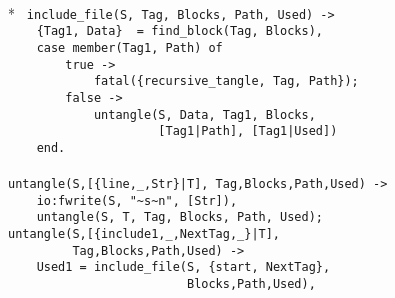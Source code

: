 \begin{flushleft}
\label{etangle_4_4}
\\*
\tt
\noindent{}%
\verb&include_file(S, Tag, Blocks, Path, Used) ->&\\
\noindent{}%
\verb&    {Tag1, Data}  = find_block(Tag, Blocks),&\\
\noindent{}%
\verb&    case member(Tag1, Path) of&\\
\noindent{}%
\verb&        true ->&\\
\noindent{}%
\verb&            fatal({recursive_tangle, Tag, Path});&\\
\noindent{}%
\verb&        false ->&\\
\noindent{}%
\verb&            untangle(S, Data, Tag1, Blocks,&\\
\noindent{}%
\verb&                     [Tag1|Path], [Tag1|Used])&\\
\noindent{}%
\verb&    end.&\\
\noindent{}%
\verb&&\\
\noindent{}%
\verb&untangle(S,[{line,_,Str}|T], Tag,Blocks,Path,Used) ->&\\
\noindent{}%
\verb&    io:fwrite(S, "~s~n", [Str]),&\\
\noindent{}%
\verb&    untangle(S, T, Tag, Blocks, Path, Used);&\\
\noindent{}%
\verb&untangle(S,[{include1,_,NextTag,_}|T],&\\
\noindent{}%
\verb&         Tag,Blocks,Path,Used) ->&\\
\noindent{}%
\verb&    Used1 = include_file(S, {start, NextTag},&\\
\noindent{}%
\verb&                         Blocks,Path,Used),&\\
\noindent{}%

\end{flushleft}
